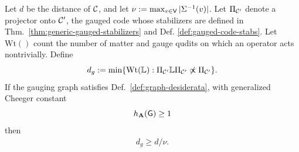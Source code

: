 \documentclass[11pt]{article}
\begin{document}
\begin{theorem}
\label{thm:space-distance}
Let $d$ be the distance of $\mathcal{C}$, and let $\nu:=\max_{v\in\mathsf{V}}|\Sigma^{-1}(v)|$. Let $\Pi_{\mathcal{C}'}$ denote a projector onto $\mathcal{C}'$, the gauged code whose stabilizers are defined in Thm.~\ref{thm:generic-gauged-stabilizers} and Def. \ref{def:gauged-code-stabs}. Let $\mathrm{Wt}()$ count the number of matter and gauge qudits on which an operator acts nontrivially. 
Define 
\[
d_g := \min\{\mathrm{Wt}(\mathbb{L}):\Pi_{\mathcal{C}'} \mathbb{L}\Pi_{\mathcal{C}'}\not\propto \Pi_{\mathcal{C}'}\}.
\] 
If the gauging graph satisfies Def.~\ref{def:graph-desiderata}, with generalized Cheeger constant 
\[
h_{\mathbf{A}}(\mathsf{G}) \geq 1\]
then
\begin{align}
    d_g\ge d/\nu.
\end{align}
\end{theorem}
\end{document}
